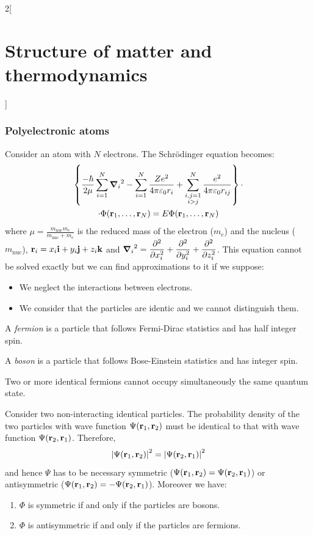 \documentclass[../../../main.tex]{subfiles}
\begin{document}
\begin{multicols}{2}[\section{Structure of matter and thermodynamics}]
  \subsubsection{Polyelectronic atoms}
  \begin{proposition}
    Consider an atom with $N$ electrons. The Schrödinger equation becomes:
    \begin{multline*}
      \left\{\frac{-\hbar}{2\mu}\sum_{i=1}^N{\grad_i}^2-\sum_{i=1}^N\frac{Ze^2}{4\pi\varepsilon_0r_i}+\sum_{\substack{i,j=1\\i>j}}^N\frac{e^2}{4\pi\varepsilon_0r_{ij}}\right\}\cdot\\\cdot\Phi(\boldsymbol{\mathrm{r}}_1,\ldots,\boldsymbol{\mathrm{r}}_N)=E\Phi(\boldsymbol{\mathrm{r}}_1,\ldots,\boldsymbol{\mathrm{r}}_N)
    \end{multline*}
    where $\displaystyle\mu=\frac{m_\text{nuc}m_e}{m_\text{nuc}+m_e}$ is the reduced mass of the electron ($m_e$) and the nucleus ($m_\text{nuc}$), $\boldsymbol{\mathrm{r}}_i=x_i\boldsymbol{\mathrm{i}}+y_i\boldsymbol{\mathrm{j}}+z_i\boldsymbol{\mathrm{k}}$ and $\displaystyle{\grad_i}^2=\pdv[2]{}{x_i}+\pdv[2]{}{y_i}+\pdv[2]{}{z_i}$.
    This equation cannot be solved exactly but we can find approximations to it if we suppose:
    \begin{itemize}
      \item We neglect the interactions between electrons.
      \item We consider that the particles are identic and we cannot distinguish them.
    \end{itemize}
  \end{proposition}
  \begin{definition}[Fermions]
    A \emph{fermion} is a particle that follows Fermi-Dirac statistics and has half integer spin.
  \end{definition}
  \begin{definition}[Boson]
    A \emph{boson} is a particle that follows Bose-Einstein statistics and has integer spin.
  \end{definition}
  \begin{proposition}
    Two or more identical fermions cannot occupy simultaneously the same quantum state.
  \end{proposition}
  \begin{proposition}
    Consider two non-interacting identical particles. The probability density of the two particles with wave function $\Psi(\boldsymbol{\mathrm{r}}_1,\boldsymbol{\mathrm{r}}_2)$ must be identical to that with wave function $\Psi(\boldsymbol{\mathrm{r}}_2,\boldsymbol{\mathrm{r}}_1)$. Therefore, $${|\Psi(\boldsymbol{\mathrm{r}}_1,\boldsymbol{\mathrm{r}}_2)|}^2={|\Psi(\boldsymbol{\mathrm{r}}_2,\boldsymbol{\mathrm{r}}_1)|}^2$$ and hence $\Psi$ has to be necessary symmetric ($\Psi(\boldsymbol{\mathrm{r}}_1,\boldsymbol{\mathrm{r}}_2)=\Psi(\boldsymbol{\mathrm{r}}_2,\boldsymbol{\mathrm{r}}_1)$) or antisymmetric ($\Psi(\boldsymbol{\mathrm{r}}_1,\boldsymbol{\mathrm{r}}_2)=-\Psi(\boldsymbol{\mathrm{r}}_2,\boldsymbol{\mathrm{r}}_1)$). Moreover we have:
    \begin{enumerate}
      \item $\Phi$ is symmetric if and only if the particles are bosons.
      \item $\Phi$ is antisymmetric if and only if the particles are fermions.
    \end{enumerate}
  \end{proposition}

\end{multicols}
\end{document}
